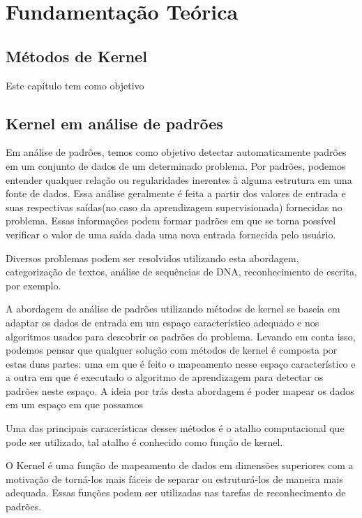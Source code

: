 \chapter{Fundamentação Teórica}\label{fund_teo}

\section{Métodos de Kernel}\label{meto_kernel}

Este capítulo tem como objetivo 


\section{Kernel em análise de padrões}\label{Sub:equa}

Em análise de padrões, temos como objetivo detectar automaticamente padrões em um conjunto de dados de um determinado problema. Por padrões, podemos entender qualquer relação ou regularidades inerentes à alguma estrutura em uma fonte de dados. Essa análise geralmente é feita a partir dos valores de entrada e suas respectivas saídas(no caso da aprendizagem supervisionada) fornecidas no problema. Essas informações podem formar padrões em que se torna possível verificar o valor de uma saída dada uma nova entrada fornecida pelo usuário. 

Diversos problemas podem ser resolvidos utilizando esta abordagem, categorização de textos, análise de sequências de DNA, reconhecimento de escrita, por exemplo.

A abordagem de análise de padrões utilizando métodos de kernel se baseia em adaptar os dados de entrada em um espaço característico adequado e nos algoritmos usados para descobrir os padrões do problema. Levando em conta isso, podemos pensar que qualquer solução com métodos de kernel é composta por estas duas partes: uma em que é feito o mapeamento nesse espaço característico e a outra em que é executado o algoritmo de aprendizagem para detectar os padrões neste espaço. A ideia por trás desta abordagem é poder mapear os dados em um espaço em que possamos 

Uma das principais caracerísticas desses métodos é o atalho computacional que pode ser utilizado, tal atalho é conhecido como função de kernel.


O Kernel  é uma função de mapeamento de dados em dimensões superiores com a motivação de torná-los mais fáceis de separar ou estruturá-los de maneira mais adequada. Essas funções podem ser utilizadas nas tarefas de reconhecimento de padrões. 

